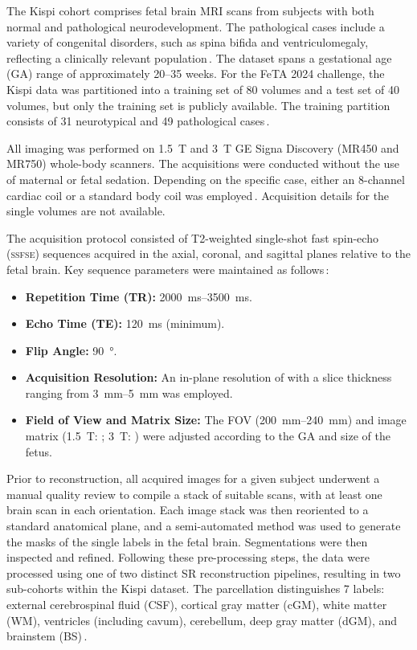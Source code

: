 The Kispi cohort comprises fetal brain MRI scans from subjects with both normal and pathological neurodevelopment. The pathological cases include a variety of congenital disorders, such as spina bifida and ventriculomegaly, reflecting a clinically relevant population\,\cite{FeTA2024_paper, Ciceri2024}. The dataset spans a gestational age (GA) range of approximately \numrange{20}{35} weeks. For the FeTA 2024 challenge, the Kispi data was partitioned into a training set of \num{80} volumes and a test set of \num{40} volumes, but only the training set is publicly available. The training partition consists of \num{31} neurotypical and \num{49} pathological cases\,\cite{FeTA2024_review}.

All imaging was performed on \qty{1.5}{\tesla} and \qty{3}{\tesla} GE Signa Discovery (MR450 and MR750) whole-body scanners. The acquisitions were conducted without the use of maternal or fetal sedation. Depending on the specific case, either an 8-channel cardiac coil or a standard body coil was employed\,\cite{FeTA2024_paper}. Acquisition details for the single volumes are not available.

The acquisition protocol consisted of T2-weighted single-shot fast spin-echo (\textsc{ssfse}) sequences acquired in the axial, coronal, and sagittal planes relative to the fetal brain. Key sequence parameters were maintained as follows\,\cite{FeTA2024_paper}:
\begin{itemize}
    \item \textbf{Repetition Time (TR):} \qtyrange[range-units = single, range-phrase = --]{2000}{3500}{\milli\second}.
    \item \textbf{Echo Time (TE):} \qty{120}{\milli\second} (minimum).
    \item \textbf{Flip Angle:} \qty{90}{\degree}.
    \item \textbf{Acquisition Resolution:} An in-plane resolution of  with a slice thickness ranging from \qtyrange[range-units = single]{3}{5}{\milli\meter} was employed.
    \item \textbf{Field of View and Matrix Size:} The FOV (\qtyrange[range-units = single, range-phrase = --]{200}{240}{\milli\meter}) and image matrix (\qty{1.5}{\tesla}: ; \qty{3}{\tesla}: ) were adjusted according to the GA and size of the fetus.
\end{itemize}

Prior to reconstruction, all acquired images for a given subject underwent a manual quality review to compile a stack of suitable scans, with at least one brain scan in each orientation. Each image stack was then reoriented to a standard anatomical plane, and a semi-automated method was used to generate the masks of the single labels in the fetal brain. Segmentations were then inspected and refined. Following these pre-processing steps, the data were processed using one of two distinct SR reconstruction pipelines, resulting in two sub-cohorts within the Kispi dataset. The parcellation distinguishes 7 labels: external cerebrospinal fluid (CSF), cortical gray matter (cGM), white matter (WM), ventricles (including cavum), cerebellum, deep gray matter (dGM), and brainstem (BS)\,\cite{FeTA2024_paper}.

